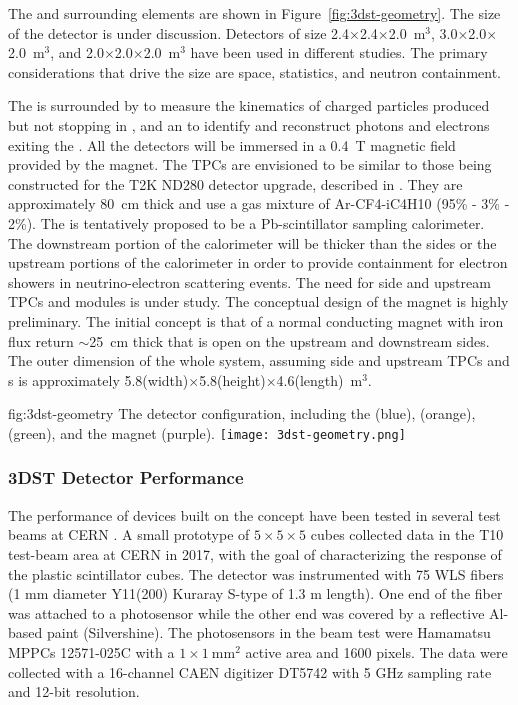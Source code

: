 The  and surrounding elements are shown in Figure~\ref{fig:3dst-geometry}.  The size of the  detector is under discussion.  Detectors of size 2.4$\times$2.4$\times$2.0~m$^{3}$, 3.0$\times$2.0$\times$2.0~m$^{3}$, and 2.0$\times$2.0$\times$2.0~m$^{3}$ have been used in different studies.  The primary considerations that drive the size are space, statistics, and neutron containment.

The  is surrounded by  to measure the kinematics of charged particles produced but not stopping in , and an  to identify and reconstruct photons and electrons exiting the . All the detectors will be immersed in a 0.4~T magnetic field provided by the magnet. The TPCs are envisioned to be similar to those being constructed for the T2K ND280 detector upgrade, described in \cite{Abe:2019whr}.  They are approximately 80~cm thick and use a gas mixture of Ar-CF4-iC4H10 (95\% - 3\% - 2\%).  The  is tentatively proposed to be a Pb-scintillator sampling calorimeter.  The downstream portion of the calorimeter will be thicker than the sides or the upstream portions of the calorimeter in order to provide containment for electron showers in neutrino-electron scattering events.  The need for side and upstream TPCs and  modules is under study.  The conceptual design of the magnet is highly preliminary.  The initial concept is that of a normal conducting magnet with iron flux return $\sim$25~cm thick that is open on the upstream and downstream sides.
The outer dimension of the whole system, assuming side and upstream TPCs and s is approximately 5.8(width)$\times$5.8(height)$\times$4.6(length)~m$^3$. 




\begin{dunefigure}{fig:3dst-geometry}
{The  detector configuration, including the  (blue),  (orange),  (green), and the magnet (purple).}
  \texttt{[image: 3dst-geometry.png]}
\end{dunefigure}


\subsubsection{3DST Detector Performance}

The performance of devices built on the  concept have been tested in several test beams at CERN \cite{Mineev:2018ekk}.
A small prototype of $5\times5\times5$ cubes collected data in the T10 test-beam area at CERN in 2017, with the goal of characterizing the response of the plastic scintillator cubes.
The detector was instrumented with 75 WLS fibers (1 mm diameter Y11(200) Kuraray S-type of 1.3 m length). One end of the fiber was attached to a photosensor while the other end was covered by a reflective Al-based paint (Silvershine). The photosensors in the beam test were Hamamatsu MPPCs 12571-025C with a $1\times1~\text{mm}^2$ active area and 1600 pixels. The data were collected with a 16-channel CAEN digitizer DT5742 with 5 GHz sampling rate and 12-bit resolution.

